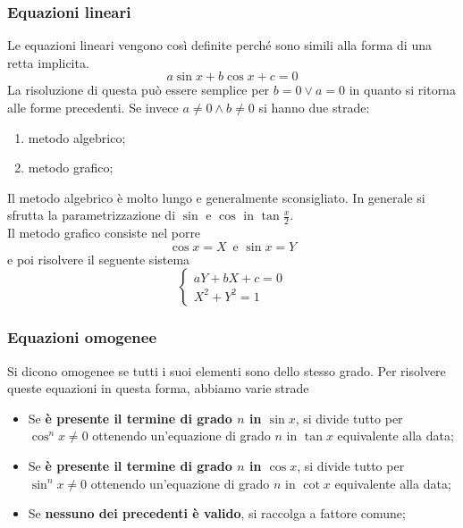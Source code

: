 \subsubsection{Equazioni lineari}
Le equazioni lineari vengono così definite perché sono simili alla forma di una retta implicita.
\begin{equation*}
a\sin x + b\cos x + c = 0
\end{equation*}
La risoluzione di questa può essere semplice per $b = 0 \lor a = 0$ in quanto si ritorna alle forme 
precedenti. Se invece $a\neq0 \land b\neq0$ si hanno due strade:
\begin{enumerate}
	\item metodo algebrico;
	\item metodo grafico;
\end{enumerate}
Il metodo algebrico è molto lungo e generalmente sconsigliato. In generale si sfrutta la 
parametrizzazione di $\sin$ e $\cos$ in $\tan \frac{x}{2}$.\\
Il metodo grafico consiste nel porre
\begin{equation*}
\cos x = X\,\text{ e } \sin x = Y
\end{equation*}
e poi risolvere il seguente sistema
\begin{equation*}
\begin{cases}
aY + bX + c = 0\\
X^2 + Y^2 = 1
\end{cases}
\end{equation*}

\subsubsection{Equazioni omogenee}
Si dicono omogenee se tutti i suoi elementi sono dello stesso grado. Per risolvere queste equazioni
in questa forma, abbiamo varie strade
\begin{itemize}
	\item Se \textbf{è presente il termine di grado $n$ in $\sin x$}, si divide tutto per 
	$\cos^nx\neq0$ ottenendo un'equazione di grado $n$ in $\tan x$ equivalente alla data;
	\item Se \textbf{è presente il termine di grado $n$ in $\cos x$}, si divide tutto per
	$\sin^nx\neq0$ ottenendo un'equazione di grado $n$ in $\cot x$ equivalente alla data;
	\item Se \textbf{nessuno dei precedenti è valido}, si raccolga a fattore comune;
\end{itemize}

